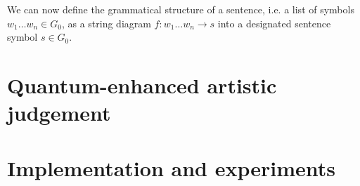 We can now define the grammatical structure of a sentence, i.e. a list of symbols $w_1 \dots w_n \in G_0$, as a string diagram $f : w_1 \dots w_n \to s$ into a designated sentence symbol $s \in G_0$.


\section{Quantum-enhanced artistic judgement}\label{quantum}
\section{Implementation and experiments}\label{discopy}

\printbibliography


